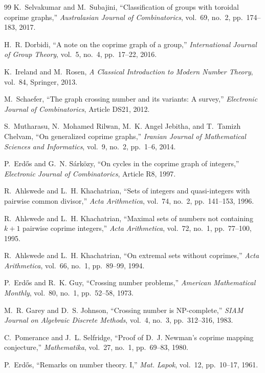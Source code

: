 \documentclass[12pt]{article}
\begin{document}
\begin{thebibliography}{99}
		K.~Selvakumar and M.~Subajini, ``Classification of groups with toroidal coprime graphs,'' \emph{Australasian Journal of Combinatorics}, vol.~69, no.~2, pp.~174--183, 2017.
		
		H.~R. Dorbidi, ``A note on the coprime graph of a group,'' \emph{International Journal of Group Theory}, vol.~5, no.~4, pp.~17--22, 2016.
		
		K.~Ireland and M.~Rosen, \emph{A Classical Introduction to Modern Number Theory}, vol.~84, Springer, 2013.
		
		M.~Schaefer, ``The graph crossing number and its variants: A survey,'' \emph{Electronic Journal of Combinatorics}, Article DS21, 2012.
		
		S.~Mutharasu, N.~Mohamed Rilwan, M.~K. Angel Jebitha, and T.~Tamizh Chelvam, ``On generalized coprime graphs,'' \emph{Iranian Journal of Mathematical Sciences and Informatics}, vol.~9, no.~2, pp.~1--6, 2014.
		
		P.~Erd\H{o}s and G.~N. S\'ark\"ozy, ``On cycles in the coprime graph of integers,'' \emph{Electronic Journal of Combinatorics}, Article R8, 1997.
		
		R.~Ahlswede and L.~H. Khachatrian, ``Sets of integers and quasi-integers with pairwise common divisor,'' \emph{Acta Arithmetica}, vol.~74, no.~2, pp.~141--153, 1996.
		
		R.~Ahlswede and L.~H. Khachatrian, ``Maximal sets of numbers not containing $k+1$ pairwise coprime integers,'' \emph{Acta Arithmetica}, vol.~72, no.~1, pp.~77--100, 1995.
		
		R.~Ahlswede and L.~H. Khachatrian, ``On extremal sets without coprimes,'' \emph{Acta Arithmetica}, vol.~66, no.~1, pp.~89--99, 1994.
		
		P.~Erd\H{o}s and R.~K. Guy, ``Crossing number problems,'' \emph{American Mathematical Monthly}, vol.~80, no.~1, pp.~52--58, 1973.
		
		M.~R. Garey and D.~S. Johnson, ``Crossing number is NP-complete,'' \emph{SIAM Journal on Algebraic Discrete Methods}, vol.~4, no.~3, pp.~312--316, 1983.
		
		C.~Pomerance and J.~L. Selfridge, ``Proof of D.~J. Newman's coprime mapping conjecture,'' \emph{Mathematika}, vol.~27, no.~1, pp.~69--83, 1980.
		
		P.~Erd\H{o}s, ``Remarks on number theory. I,'' \emph{Mat. Lapok}, vol.~12, pp.~10--17, 1961.
		
	\end{thebibliography}
	
	
\end{document}
